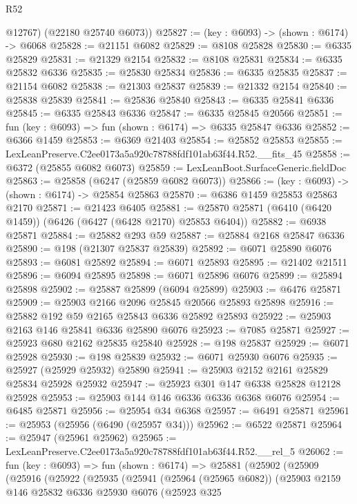 \begin{lexlean}{R52}
\begin{coremodule}
        @12767)
      (@22180 @25740 @6073))
@25827 := (key : @6093) -> (shown : @6174) -> @6068
@25828 := @21151 @6082
@25829 := @8108 @25828
@25830 := @6335 @25829
@25831 := @21329 @2154
@25832 := @8108 @25831
@25834 := @6335 @25832 @6336
@25835 := @25830 @25834
@25836 := @6335 @25835
@25837 := @21154 @6082
@25838 := @21303 @25837
@25839 := @21332 @2154
@25840 := @25838 @25839
@25841 := @25836 @25840
@25843 := @6335 @25841 @6336
@25845 := @6335 @25843 @6336
@25847 := @6335 @25845 @20566
@25851 := fun (key : @6093) => fun (shown : @6174) => @6335 @25847 @6336
@25852 := @6366 @1459
@25853 := @6369 @21403
@25854 := @25852 @25853
@25855 := LexLeanPreserve.C2ee0173a5a920c78788fdf101ab63f44.R52.__fits_45
@25858 := @6372 (@25855 @6082 @6073)
@25859 := LexLeanBoot.SurfaceGeneric.fieldDoc
@25863 := @25858 (@6247 (@25859 @6082 @6073))
@25866 := (key : @6093) -> (shown : @6174) -> @25854 @25863
@25870 := @6386 @1459 @25853 @25863 @2170
@25871 := @21423 @6405
@25881 := @25870 @25871 (@6410 (@6420 @1459)) (@6426 (@6427 (@6428 @2170) @25853 @6404))
@25882 := @6938 @25871
@25884 := @25882 @293 @59
@25887 := @25884 @2168 @25847 @6336
@25890 := @198 (@21307 @25837 @25839)
@25892 := @6071 @25890 @6076
@25893 := @6081 @25892
@25894 := @6071 @25893
@25895 := @21402 @21511
@25896 := @6094 @25895
@25898 := @6071 @25896 @6076
@25899 := @25894 @25898
@25902 := @25887 @25899 (@6094 @25899)
@25903 := @6476 @25871
@25909 := @25903 @2166 @2096 @25845 @20566 @25893 @25898
@25916 := @25882 @192 @59 @2165 @25843 @6336 @25892 @25893
@25922 := @25903 @2163 @146 @25841 @6336 @25890 @6076
@25923 := @7085 @25871
@25927 := @25923 @680 @2162 @25835 @25840
@25928 := @198 @25837
@25929 := @6071 @25928
@25930 := @198 @25839
@25932 := @6071 @25930 @6076
@25935 := @25927 (@25929 @25932) @25890
@25941 := @25903 @2152 @2161 @25829 @25834 @25928 @25932
@25947 := @25923 @301 @147 @6338 @25828 @12128 @25928
@25953 := @25903 @144 @146 @6336 @6336 @6368 @6076
@25954 := @6485 @25871
@25956 := @25954 @34 @6368
@25957 := @6491 @25871
@25961 := @25953 (@25956 (@6490 (@25957 @34)))
@25962 := @6522 @25871
@25964 := @25947 (@25961 @25962)
@25965 := LexLeanPreserve.C2ee0173a5a920c78788fdf101ab63f44.R52.__rel_5
@26062 := fun (key : @6093) =>
  fun (shown : @6174) =>
  @25881
    (@25902
      (@25909
        (@25916
          (@25922
            (@25935
              (@25941
                (@25964 (@25965 @6082))
                (@25903
                  @2159
                  @146
                  @25832
                  @6336
                  @25930
                  @6076
                  (@25923
                    @325

\end{coremodule}
\end{lexlean}
